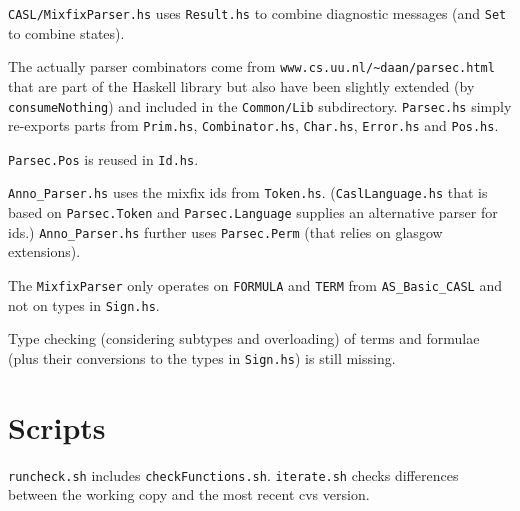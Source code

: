 \documentclass{article}
\begin{document}
\texttt{CASL/MixfixParser.hs} uses \texttt{Result.hs} to combine
diagnostic messages (and \texttt{Set} to combine states).

The actually parser combinators come from 
\texttt{www.cs.uu.nl/\~{}daan/parsec.html} that are part of the
Haskell library but also have been slightly extended (by
\texttt{consumeNothing}) and included in the \texttt{Common/Lib}
subdirectory. \texttt{Parsec.hs} simply re-exports parts from
\texttt{Prim.hs}, \texttt{Combinator.hs},
\texttt{Char.hs}, \texttt{Error.hs} and
\texttt{Pos.hs}. 

\texttt{Parsec.Pos} is reused in \texttt{Id.hs}.

\texttt{Anno\_Parser.hs} uses the mixfix ids from \texttt{Token.hs}.
(\texttt{CaslLanguage.hs} that is based on \texttt{Parsec.Token} and
\texttt{Parsec.Language} supplies an alternative parser for ids.)
\texttt{Anno\_Parser.hs} further uses \texttt{Parsec.Perm} (that relies on
glasgow extensions).

The \texttt{MixfixParser} only operates on \texttt{FORMULA} and
\texttt{TERM} from \texttt{AS\_Basic\_CASL} and not on
types in \texttt{Sign.hs}. 

Type checking (considering subtypes and overloading) of terms and
formulae (plus their conversions to the types in \texttt{Sign.hs}) is
still missing.

\section{Scripts}

\texttt{runcheck.sh} includes \texttt{checkFunctions.sh}.
\texttt{iterate.sh} checks differences between the working copy and
the most recent cvs version.
\end{document}
